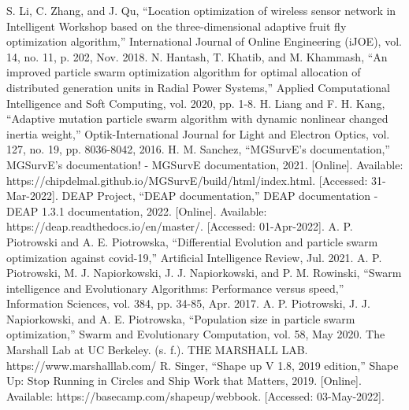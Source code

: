 \documentclass[letterpaper]{report}
\begin{document}
\begin{thebibliography}{99}
  S. Li, C. Zhang, and J. Qu, “Location optimization of wireless sensor network in Intelligent Workshop based on the three-dimensional adaptive fruit fly optimization algorithm,” International Journal of Online Engineering (iJOE), vol. 14, no. 11, p. 202, Nov. 2018. 
  N. Hantash, T. Khatib, and M. Khammash, “An improved particle swarm optimization algorithm for optimal allocation of distributed generation units in Radial Power Systems,” Applied Computational Intelligence and Soft Computing, vol. 2020, pp. 1-8.
  H. Liang and F. H. Kang, “Adaptive mutation particle swarm algorithm with dynamic nonlinear changed inertia weight,” Optik-International Journal for Light and Electron Optics, vol. 127, no. 19, pp. 8036-8042, 2016.
  H. M. Sanchez, “MGSurvE's documentation,” MGSurvE's documentation! - MGSurvE documentation, 2021. [Online]. Available: https://chipdelmal.github.io/MGSurvE/build/html/index.html. [Accessed: 31-Mar-2022]. 
  DEAP Project, “DEAP documentation,” DEAP documentation - DEAP 1.3.1 documentation, 2022. [Online]. Available: https://deap.readthedocs.io/en/master/. [Accessed: 01-Apr-2022]. 
  A. P. Piotrowski and A. E. Piotrowska, “Differential Evolution and particle swarm optimization against covid-19,” Artificial Intelligence Review, Jul. 2021. 
  A. P. Piotrowski, M. J. Napiorkowski, J. J. Napiorkowski, and P. M. Rowinski, “Swarm intelligence and Evolutionary Algorithms: Performance versus speed,” Information Sciences, vol. 384, pp. 34-85, Apr. 2017. 
  A. P. Piotrowski, J. J. Napiorkowski, and A. E. Piotrowska, “Population size in particle swarm optimization,” Swarm and Evolutionary Computation, vol. 58, May 2020. 
  The Marshall Lab at UC Berkeley. (s. f.). THE MARSHALL LAB. https://www.marshalllab.com/
  R. Singer, “Shape up V 1.8, 2019 edition,” Shape Up: Stop Running in Circles and Ship Work that Matters, 2019. [Online]. Available: https://basecamp.com/shapeup/webbook. [Accessed: 03-May-2022]. 
\end{thebibliography}
\end{document}
